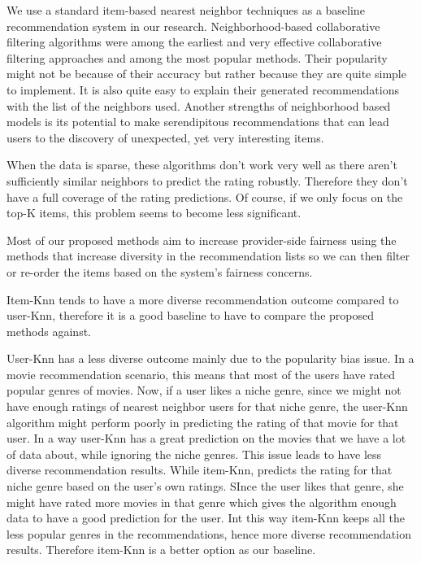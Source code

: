         We use a standard item-based nearest neighbor techniques \cite{desrosiers2011comprehensive} as a baseline recommendation system in our research. Neighborhood-based collaborative filtering algorithms were among the earliest and very effective collaborative filtering approaches and among the most popular methods. Their popularity might not be because of their accuracy but rather because they are quite simple to implement. It is also quite easy to explain their generated recommendations with the list of the neighbors used. Another strengths of neighborhood based models is its potential to make serendipitous recommendations that can lead users to the discovery of unexpected, yet very interesting items.
        
        When the data is sparse, these algorithms don't work very well as there aren't sufficiently similar neighbors to predict the rating robustly. Therefore they don't have a full coverage of the rating predictions. Of course, if we only focus on the top-K items, this problem seems to become less significant.
        
        Most of our proposed methods aim to increase provider-side fairness using the methods that increase diversity in the recommendation lists so we can then filter or re-order the items based on the system's fairness concerns. 
        
        Item-Knn tends to have a more diverse recommendation outcome compared to user-Knn, therefore it is a good baseline to have to compare the proposed methods against.
        
        User-Knn has a less diverse outcome mainly due to the popularity bias issue. In a movie recommendation scenario, this means that most of the users have rated popular genres of movies. Now, if a user likes a niche genre, since we might not have enough ratings of nearest neighbor users for that niche genre, the user-Knn algorithm might perform poorly in predicting the rating of that movie for that user. In a way user-Knn has a great prediction on the movies that we have a lot of data about, while ignoring the niche genres. This issue leads to have less diverse recommendation results. While item-Knn, predicts the rating for that niche genre based on the user's own ratings. SInce the user likes that genre, she might have rated more movies in that genre which gives the algorithm enough data to have a good prediction for the user. Int this way item-Knn keeps all the less popular genres in the recommendations, hence more diverse recommendation results. Therefore item-Knn is a better option as our baseline.
        
